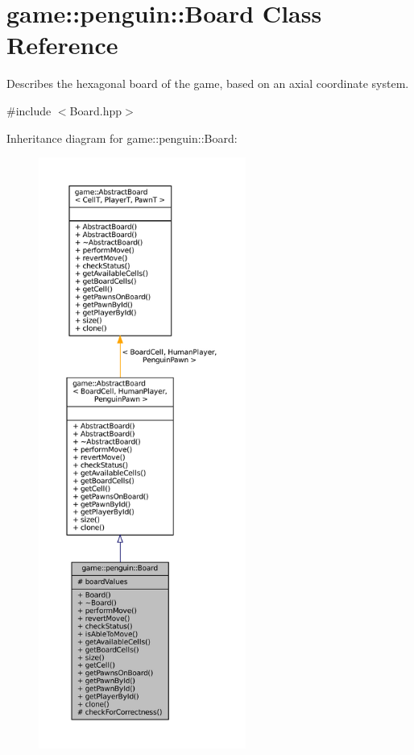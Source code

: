 \hypertarget{classgame_1_1penguin_1_1_board}{}\section{game\+:\+:penguin\+:\+:Board Class Reference}
\label{classgame_1_1penguin_1_1_board}


Describes the hexagonal board of the game, based on an axial coordinate system.  




{\ttfamily \#include $<$Board.\+hpp$>$}



Inheritance diagram for game\+:\+:penguin\+:\+:Board\+:
\nopagebreak
\begin{figure}[H]
\begin{center}
\leavevmode
\includegraphics[height=550pt]{classgame_1_1penguin_1_1_board__inherit__graph}
\end{center}
\end{figure}


